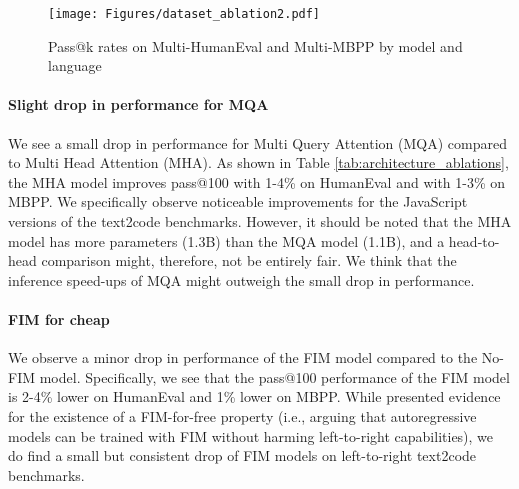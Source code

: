 \documentclass[10pt]{article} \usepackage{iclr2023_conference,times}
\begin{document}
\begin{figure}[t]
    \centering
    \texttt{[image: Figures/dataset\_ablation2.pdf]}
    \caption{Pass@k rates on Multi-HumanEval and Multi-MBPP by model and language}
    \label{fig:multiple_results}
\end{figure}

\paragraph{Slight drop in performance for MQA} We see a small drop in performance for Multi Query Attention (MQA) compared to Multi Head Attention (MHA). As shown in Table \ref{tab:architecture_ablations}, the MHA model improves pass@100 with 1-4\% on HumanEval and with 1-3\% on MBPP. We specifically observe noticeable improvements for the JavaScript versions of the text2code benchmarks. However, it should be noted that the MHA model has more parameters (1.3B) than the MQA model (1.1B), and a head-to-head comparison might, therefore, not be entirely fair. We think that the inference speed-ups of MQA might outweigh the small drop in performance. 

\paragraph{FIM for cheap} We observe a minor drop in performance of the FIM model compared to the No-FIM model. Specifically, we see that the pass@100 performance of the FIM model is 2-4\% lower on HumanEval and 1\% lower on MBPP. While \citet{bavarian2022fim} presented evidence for the existence of a FIM-for-free property (i.e., arguing that autoregressive models can be trained with FIM without harming left-to-right capabilities), we do find a small but consistent drop of FIM models on left-to-right text2code benchmarks.  
\end{document}
